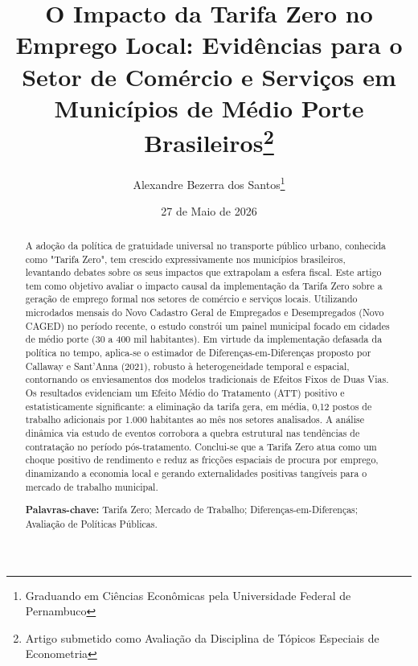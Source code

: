 \documentclass[12pt, a4paper]{article}
\begin{document}
\title{O Impacto da Tarifa Zero no Emprego Local: Evidências para o Setor de Comércio e Serviços em Municípios de Médio Porte Brasileiros\thanks{Artigo submetido como Avaliação da Disciplina de Tópicos Especiais de Econometria}}

\author{Alexandre Bezerra dos Santos\thanks{Graduando em Ciências Econômicas pela Universidade Federal de Pernambuco}}

\date{27 de Maio de 2026}

\maketitle

\begin{abstract}
A adoção da política de gratuidade universal no transporte público urbano, conhecida como "Tarifa Zero", tem crescido expressivamente nos municípios brasileiros, levantando debates sobre os seus impactos que extrapolam a esfera fiscal. Este artigo tem como objetivo avaliar o impacto causal da implementação da Tarifa Zero sobre a geração de emprego formal nos setores de comércio e serviços locais. Utilizando microdados mensais do Novo Cadastro Geral de Empregados e Desempregados (Novo CAGED) no período recente, o estudo constrói um painel municipal focado em cidades de médio porte (30 a 400 mil habitantes). Em virtude da implementação defasada da política no tempo, aplica-se o estimador de Diferenças-em-Diferenças proposto por Callaway e Sant'Anna (2021), robusto à heterogeneidade temporal e espacial, contornando os enviesamentos dos modelos tradicionais de Efeitos Fixos de Duas Vias. Os resultados evidenciam um Efeito Médio do Tratamento (ATT) positivo e estatisticamente significante: a eliminação da tarifa gera, em média, 0,12 postos de trabalho adicionais por 1.000 habitantes ao mês nos setores analisados. A análise dinâmica via estudo de eventos corrobora a quebra estrutural nas tendências de contratação no período pós-tratamento. Conclui-se que a Tarifa Zero atua como um choque positivo de rendimento e reduz as fricções espaciais de procura por emprego, dinamizando a economia local e gerando externalidades positivas tangíveis para o mercado de trabalho municipal. 

\vspace{0.5cm}
\noindent \textbf{Palavras-chave:} Tarifa Zero; Mercado de Trabalho; Diferenças-em-Diferenças; Avaliação de Políticas Públicas.
\end{abstract}
\end{document}
